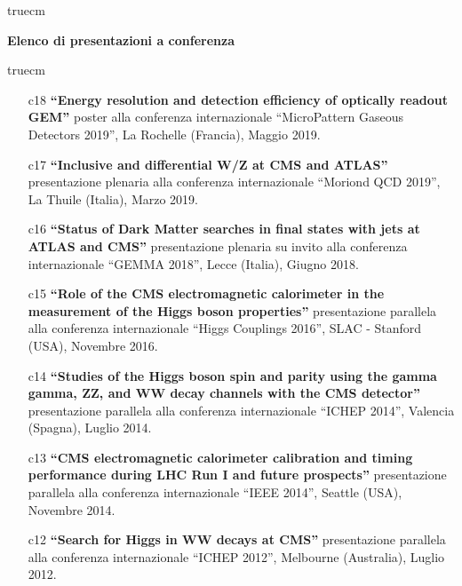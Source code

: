 \documentclass[11pt,twoside,a4paper]{article}
\begin{document}
 truecm
\begin{center}
{\bf{Elenco di presentazioni a conferenza}}
\end{center}
 truecm

\begin{enumerate}

\item [c18] \textbf{``Energy resolution and detection efficiency of
  optically readout GEM''} poster alla conferenza internazionale
  ``MicroPattern Gaseous Detectors 2019'', La Rochelle (Francia),
  Maggio 2019.
  \vspace{2mm}

\item [c17] \textbf{``Inclusive and differential W/Z at CMS and ATLAS''}
  presentazione plenaria alla conferenza internazionale ``Moriond QCD
  2019'', La Thuile (Italia), Marzo 2019.
  \vspace{2mm}

\item [c16] \textbf{``Status of Dark Matter searches in final states with
  jets at ATLAS and CMS''} presentazione plenaria su invito alla
  conferenza internazionale ``GEMMA 2018'', Lecce (Italia), Giugno 2018.
  \vspace{2mm}

\item [c15] \textbf{``Role of the CMS electromagnetic calorimeter in the
  measurement of the Higgs boson properties''} presentazione parallela
  alla conferenza internazionale ``Higgs Couplings 2016'', SLAC -
  Stanford (USA), Novembre 2016.
  \vspace{2mm}

\item [c14] \textbf{``Studies of the Higgs boson spin and parity using
  the gamma gamma, ZZ, and WW decay channels with the CMS detector''}
  presentazione parallela alla conferenza internazionale ``ICHEP
  2014'', Valencia (Spagna), Luglio 2014.
  \vspace{2mm}

\item [c13] \textbf{``CMS electromagnetic calorimeter calibration and
  timing performance during LHC Run I and future prospects''}
  presentazione parallela alla conferenza internazionale ``IEEE
  2014'', Seattle (USA), Novembre 2014.
  \vspace{2mm}

\item [c12] \textbf{``Search for Higgs in WW decays at CMS''}
  presentazione parallela alla conferenza internazionale ``ICHEP
  2012'', Melbourne (Australia), Luglio 2012.
  \vspace{2mm}


\end{enumerate}
\end{document}
